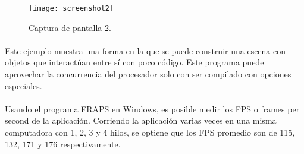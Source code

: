 \documentclass{standalone}
\begin{document}
\begin{figure}[h!]
  \caption{Captura de pantalla 2.}
  \begin{center}
    \texttt{[image: screenshot2]}
  \end{center}
\end{figure}

\paragraph{}
Este ejemplo muestra una forma en la que se puede construir una escena con objetos que interactúan entre sí con poco código. Este programa puede aprovechar la concurrencia del procesador solo con ser compilado con opciones especiales.

\paragraph{}
Usando el programa FRAPS en Windows, es posible medir los FPS o frames per second de la aplicación. Corriendo la aplicación varias veces en una misma computadora con 1, 2, 3 y 4 hilos, se optiene que los FPS promedio son de 115, 132, 171 y 176 respectivamente.
\end{document}
